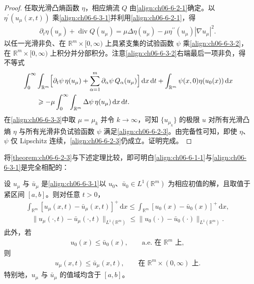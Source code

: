 \documentclass[../../main.tex]{subfiles}
\begin{document}
\begin{proof}
任取光滑凸熵函数 $\eta$，相应熵流 $Q$ 由\eqref{align:ch06-6-2-1}确定。以 $\eta^{\prime}(u_{\mu}(x,t))$ 乘\eqref{align:ch06-6-3-1}并利用\eqref{align:ch06-6-2-1}，得
\begin{align}
\partial_{t}\eta(u_{\mu})+\operatorname{div}Q(u_{\mu})=\mu\Delta\eta(u_{\mu})-\mu\eta^{\prime\prime}(u_{\mu})|\nabla u_{\mu}|^{2}.
\label{align:ch06-6-3-2}
\end{align}
以任一光滑非负、在 $\mathbb{R}^{m}\times[0,\infty)$ 上具紧支集的试验函数 $\psi$ 乘\eqref{align:ch06-6-3-2}，在 $\mathbb{R}^{m}\times[0,\infty)$ 上积分并分部积分。注意\eqref{align:ch06-6-3-2}右端最后一项非负，得不等式
\begin{align}
&\int_{0}^{\infty}\int_{\mathbb{R}^{m}}\Bigl{[}\partial_{t}\psi\,\eta(u_{\mu})+\sum_{\alpha=1}^{m}\partial_{\alpha}\psi\,Q_{\alpha}(u_{\mu})\Bigr{]}\,\mathrm{d}x\,\mathrm{d}t+\int_{\mathbb{R}^{m}}\psi(x,0)\eta(u_{0}(x))\,\mathrm{d}x\notag\\
&\qquad\geqslant-\mu\int_{0}^{\infty}\int_{\mathbb{R}^{m}}\Delta\psi\,\eta(u_{\mu})\,\mathrm{d}x\,\mathrm{d}t.
\label{align:ch06-6-3-3}
\end{align}
在\eqref{align:ch06-6-3-3}中取 $\mu=\mu_{k}$ 并令 $k\to\infty$，可知 $\{u_{\mu_{k}}\}$ 的极限 $u$ 对所有光滑凸熵 $\eta$ 与所有光滑非负试验函数 $\psi$ 满足\eqref{align:ch06-6-2-3}。由完备性可知，即使 $\eta$、$\psi$ 仅 Lipschitz 连续，\eqref{align:ch06-6-2-3}仍成立。证明完成。
\end{proof}

将\cref{theorem:ch06-6-2-3}与下述定理比较，即可明白\eqref{align:ch06-6-1-1}与\eqref{align:ch06-6-3-1}是完全相配的：

\begin{theorem}\label{theorem:ch06-6-3-2}
设 $u_{\mu}$ 与 $\bar{u}_{\mu}$ 是\eqref{align:ch06-6-3-1}以 $u_{0}$、$\bar{u}_{0}\in L^{1}(\mathbb{R}^{m})$ 为相应初值的解，且取值于紧区间 $[a,b]$。则对任意 $t>0$，
\begin{align}
\int_{\mathbb{R}^{m}}[u_{\mu}(x,t)-\bar{u}_{\mu}(x,t)]^{+}\,\mathrm{d}x\leqslant\int_{\mathbb{R}^{m}}[u_{0}(x)-\bar{u}_{0}(x)]^{+}\,\mathrm{d}x,
\label{align:ch06-6-3-4}
\end{align}
\begin{align}
\|u_{\mu}(\cdot,t)-\bar{u}_{\mu}(\cdot,t)\|_{L^{1}(\mathbb{R}^{m})}\leqslant\|u_{0}(\cdot)-\bar{u}_{0}(\cdot)\|_{L^{1}(\mathbb{R}^{m})}.
\label{align:ch06-6-3-5}
\end{align}
此外，若
\begin{align}
u_{0}(x)\leqslant\bar{u}_{0}(x),\qquad\text{a.e.\ 在 }\mathbb{R}^{m}\text{ 上},
\label{align:ch06-6-3-6}
\end{align}
则
\begin{align}
u_{\mu}(x,t)\leqslant\bar{u}_{\mu}(x,t),\qquad\text{在 }\mathbb{R}^{m}\times(0,\infty)\text{ 上}.
\label{align:ch06-6-3-7}
\end{align}
特别地，$u_{\mu}$ 与 $\bar{u}_{\mu}$ 的值域均含于 $[a,b]$。
\end{theorem}
\end{document}
